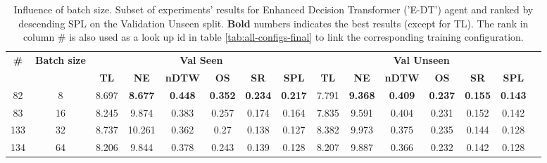\begin{table}
\centering
\caption{\label{tab:e_dt_batch_test}Influence of batch size. Subset of experiments' results for Enhanced Decision Transformer ('E-DT') agent and ranked by descending SPL on the Validation Unseen split. \textbf{Bold} numbers indicates the best results (except for TL). The rank in column \# is also used as a look up id in table \ref{tab:all-configs-final} to link the corresponding training configuration.}
\begin{tabular}{@{\hskip3pt}c@{\hskip3pt}c@{\hskip3pt}c@{\hskip3pt}c@{\hskip3pt}c@{\hskip3pt}c@{\hskip3pt}c@{\hskip3pt}c@{\hskip3pt}c@{\hskip3pt}c@{\hskip3pt}c@{\hskip3pt}c@{\hskip3pt}c@{\hskip3pt}c@{\hskip3pt}c}
\toprule
                                  \textbf{\#} & \textbf{Batch size} & \multicolumn{6}{c}{\textbf{Val Seen}} & \multicolumn{6}{c}{\textbf{Val Unseen}} \\
\cmidrule(l){3-8}\cmidrule(l){9-14}\textbf{~} &          \textbf{~} &       \textbf{TL} &     \textbf{NE} &   \textbf{nDTW} &     \textbf{OS} &     \textbf{SR} &    \textbf{SPL} &         \textbf{TL} &     \textbf{NE} &   \textbf{nDTW} &     \textbf{OS} &     \textbf{SR} &    \textbf{SPL} \\
\midrule
                                           82 &                   8 &             8.697 &  \textbf{8.677} &  \textbf{0.448} &  \textbf{0.352} &  \textbf{0.234} &  \textbf{0.217} &               7.791 &  \textbf{9.368} &  \textbf{0.409} &  \textbf{0.237} &  \textbf{0.155} &  \textbf{0.143} \\
                                           83 &                  16 &             8.245 &           9.874 &           0.383 &           0.257 &           0.174 &           0.164 &               7.835 &           9.591 &           0.404 &           0.231 &           0.152 &           0.142 \\
                                          133 &                  32 &             8.737 &          10.261 &           0.362 &            0.27 &           0.138 &           0.127 &               8.382 &           9.973 &           0.375 &           0.235 &           0.144 &           0.128 \\
                                          134 &                  64 &             8.206 &           9.844 &           0.378 &           0.243 &           0.139 &           0.128 &               8.207 &           9.887 &           0.366 &           0.232 &           0.142 &           0.128 \\
\bottomrule
\end{tabular}
\end{table}
